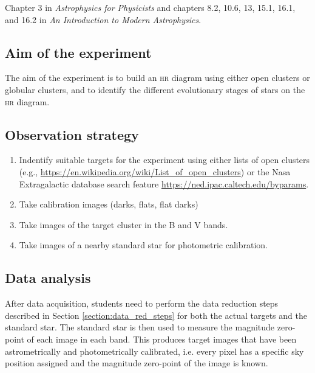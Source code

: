 \documentclass[a4paper, 11pt, fleqn]{memoir}
\begin{document}
Chapter 3 in \emph{Astrophysics for Physicists}\autocite{Choudhuri} and chapters 8.2, 10.6, 13, 15.1, 16.1, and 16.2 in \emph{An Introduction to Modern Astrophysics}\autocite{carroll2017introduction}.

\subsection{Aim of the experiment}

The aim of the experiment is to build an \textsc{hr} diagram using either open clusters or globular clusters, and to identify the different evolutionary stages of stars on the \textsc{hr} diagram.

\subsection{Observation strategy}
\begin{enumerate}
    \item Indentify suitable targets for the experiment using either lists of open clusters (e.g., \url{https://en.wikipedia.org/wiki/List_of_open_clusters}) or the Nasa Extragalactic database search feature \url{https://ned.ipac.caltech.edu/byparams}.
    \item Take calibration images (darks, flats, flat darks)
    \item Take images of the target cluster in the B and V bands.
    \item Take images of a nearby standard star for photometric calibration.
\end{enumerate}

\subsection{Data analysis}

After data acquisition, students need to perform the data reduction steps described in Section \ref{section:data_red_steps} for both the actual targets and the standard star.
The standard star is then used to measure the magnitude zero-point of each image in each band.
This produces target images that have been astrometrically and photometrically calibrated, i.e. every pixel has a specific sky position assigned and the magnitude zero-point of the image is known.
\end{document}
